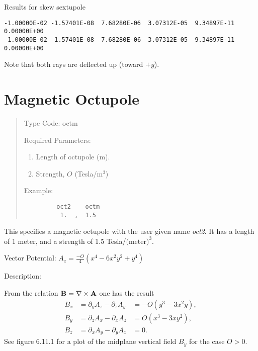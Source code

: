 \noindent Results for skew sextupole
\begin{footnotesize}
\begin{verbatim}
-1.00000E-02 -1.57401E-08  7.68280E-06  3.07312E-05  9.34897E-11  0.00000E+00
 1.00000E-02  1.57401E-08  7.68280E-06  3.07312E-05  9.34897E-11  0.00000E+00
\end{verbatim}
\end{footnotesize}
Note that both rays are deflected up (toward $+y$).


\newpage
\section{Magnetic Octupole}
\begin{quotation}
\noindent Type Code:  octm
\vspace{5mm}

\noindent Required Parameters:
\begin{enumerate}
   \item  Length of octupole (m).
   \item  Strength, $O$ (Tesla/$\mbox{m}^3$)
\end{enumerate}

\vspace{5mm}
\noindent     Example:
\begin{verbatim}
         oct2    octm
          1.  ,  1.5
\end{verbatim}
\end{quotation}
This specifies a magnetic octupole with the user given name {\em oct2}.  It has a
length of 1 meter, and a strength of 1.5 Tesla/$\mbox{(meter)}^3$.

\vspace{5mm}
     Vector Potential:  $\displaystyle A_z = \frac{-O}{4}(x^4 - 6x^2 y^2 + y^4)$

\vspace{5mm}
     Description:
\vspace{2mm}

   From the relation ${\bf B} = \nabla\times{\bf A}$ one has the result
\begin{eqnarray*}
B_x &= \partial_y A_z - \partial_z A_y &= -O(y^3 - 3x^2 y),\\
B_y &= \partial_z A_x - \partial_x A_z &= O(x^3 - 3x y^2),\\
B_z &= \partial_x A_y - \partial_y A_x &= 0.
\end{eqnarray*}
See figure 6.11.1 for a plot of the midplane vertical field $B_y$ for the case $O>0$.

